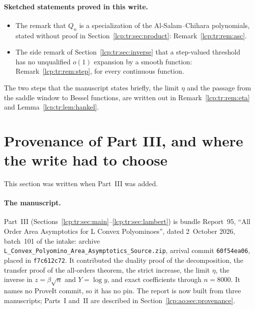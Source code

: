 \documentclass[11pt]{article}
\numberwithin{equation}{section}
\theoremstyle{definition}\newtheorem{definition}[theorem]{Definition}
\theoremstyle{remark}\newtheorem{remark}[theorem]{Remark}
\begin{document}
\paragraph{Sketched statements proved in this write.}
\begin{itemize}[leftmargin=*,itemsep=0.15em]
\item The remark that $Q_n$ is a specialization of the Al-Salam--Chihara
 polynomials, stated without proof in Section~\ref{lcp:tr:sec:product}:
 Remark~\ref{lcp:tr:rem:asc}.
\item The side remark of Section~\ref{lcp:tr:sec:inverse} that a
 step-valued threshold has no unqualified $o(1)$ expansion by a smooth
 function: Remark~\ref{lcp:tr:rem:step}, for every continuous function.
\end{itemize}
The two steps that the manuscript states briefly, the limit $\eta$ and the
passage from the saddle window to Bessel functions, are written out in
Remark~\ref{lcp:tr:rem:eta} and Lemma~\ref{lcp:tr:lem:hankel}.

\section{Provenance of Part III, and where the write had to choose}\label{lcp:tr:sec:provenance}
This section was written when Part~III was added.

\paragraph{The manuscript.} Part~III
(Sections~\ref{lcp:tr:sec:main}--\ref{lcp:tr:sec:lambert}) is bundle
Report~95, ``All Order Area Asymptotics for L Convex Polyominoes'', dated
2~October 2026, batch~101 of the intake: archive
\texttt{L\_\allowbreak Convex\_\allowbreak Polyomino\_\allowbreak Area\_\allowbreak Asymptotics\_\allowbreak Source.zip},
arrival commit \texttt{60f54ea06}, placed in \texttt{f7c612c72}. It
contributed the duality proof of the decomposition, the transfer proof of
the all-orders theorem, the strict increase, the limit $\eta$, the
inverse in $z=\beta\sqrt n$ and $Y=\log y$, and exact coefficients through
$n=8000$. It names no ProveIt commit, so it has no pin. The report is now
built from three manuscripts; Parts~I and~II are described in
Section~\ref{lcp:ao:sec:provenance}.
\end{document}
